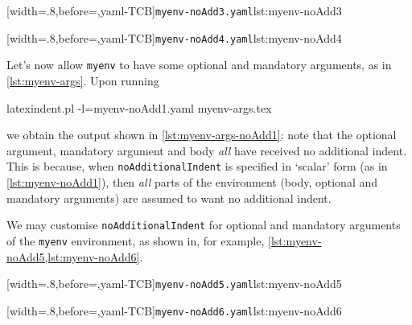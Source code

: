 	\begin{minipage}{.45\textwidth}
		[width=.8\linewidth,before=\centering,yaml-TCB]{\texttt{myenv-noAdd3.yaml}}{lst:myenv-noAdd3}
	\end{minipage}
	\hfill
	\begin{minipage}{.45\textwidth}
		[width=.8\linewidth,before=\centering,yaml-TCB]{\texttt{myenv-noAdd4.yaml}}{lst:myenv-noAdd4}
	\end{minipage}


	Let's now allow \texttt{myenv} to have some optional and mandatory arguments, as in \cref{lst:myenv-args}.
	Upon running
	\begin{commandshell}
latexindent.pl -l=myenv-noAdd1.yaml myenv-args.tex  
\end{commandshell}
	we obtain the output shown in \cref{lst:myenv-args-noAdd1}; note that the optional argument, mandatory argument and body \emph{all}
	have received no additional indent. This is because, when \texttt{noAdditionalIndent} is specified in `scalar' form (as in \cref{lst:myenv-noAdd1}),
	then \emph{all} parts of the environment (body, optional and mandatory arguments) are assumed to want no additional indent.

	We may customise \texttt{noAdditionalIndent} for optional and mandatory arguments of the \texttt{myenv} environment, as shown in, for example, \cref{lst:myenv-noAdd5,lst:myenv-noAdd6}.

	\begin{minipage}{.49\textwidth}
		[width=.8\linewidth,before=\centering,yaml-TCB]{\texttt{myenv-noAdd5.yaml}}{lst:myenv-noAdd5}
	\end{minipage}
	\hfill
	\begin{minipage}{.49\textwidth}
		[width=.8\linewidth,before=\centering,yaml-TCB]{\texttt{myenv-noAdd6.yaml}}{lst:myenv-noAdd6}
	\end{minipage}

